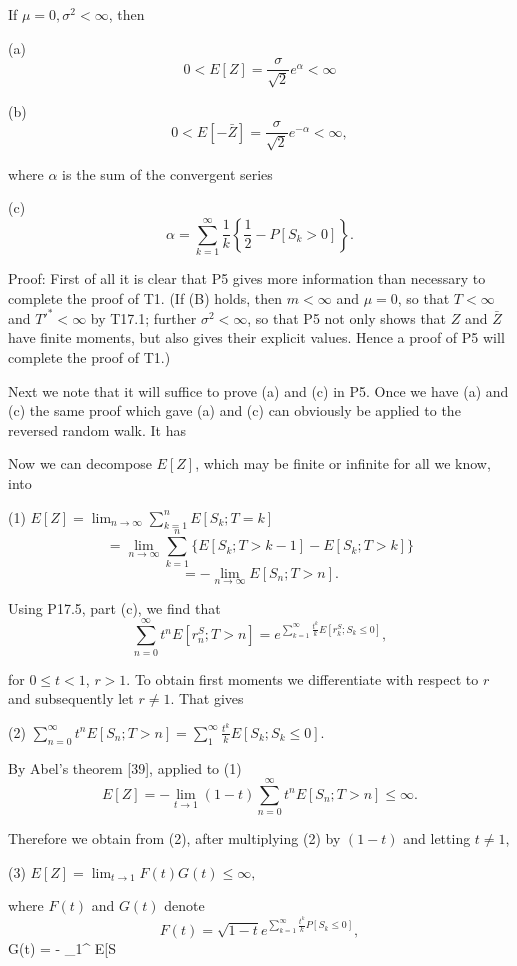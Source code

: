 If $\mu = 0, \sigma^2 < \infty$, then

(a) $$0 < E[Z] = \frac{\sigma}{\sqrt{2}} e^\alpha < \infty$$

(b) $$0 < E[-\bar{Z}] = \frac{\sigma}{\sqrt{2}} e^{-\alpha} < \infty,$$

where $\alpha$ is the sum of the convergent series

(c) $$\alpha = \sum_{k=1}^{\infty} \frac{1}{k} \left\{ \frac{1}{2} - P[S_k > 0] \right\}.$$

Proof: First of all it is clear that P5 gives more information than necessary to complete the proof of T1. (If (B) holds, then $m < \infty$ and $\mu = 0$, so that $T < \infty$ and $T'^* < \infty$ by T17.1; further $\sigma^2 < \infty$, so that P5 not only shows that $Z$ and $\bar{Z}$ have finite moments, but also gives their explicit values. Hence a proof of P5 will complete the proof of T1.)

Next we note that it will suffice to prove (a) and (c) in P5. Once we have (a) and (c) the same proof which gave (a) and (c) can obviously be applied to the reversed random walk. It has

Now we can decompose $E[Z]$, which may be finite or infinite for all we know, into

(1) $E[Z] = \lim_{n \to \infty} \sum_{k=1}^{n} E[S_k; T = k]$
$$= \lim_{n \to \infty} \sum_{k=1}^{n} \{E[S_k; T > k - 1] - E[S_k; T > k]\}$$
$$= - \lim_{n \to \infty} E[S_n; T > n].$$

Using P17.5, part (c), we find that
$$\sum_{n=0}^{\infty} t^n E[r^S_n; T > n] = e^{\sum_{k=1}^{\infty} \frac{t^k}{k} E[r^S_k; S_k \leq 0]},$$

for $0 \leq t < 1$, $r > 1$. To obtain first moments we differentiate with respect to $r$ and subsequently let $r \neq 1$. That gives

(2) $\sum_{n=0}^{\infty} t^n E[S_n; T > n] = \sum_{1}^{\infty} \frac{t^k}{k} E[S_k; S_k \leq 0]$.

By Abel's theorem [39], applied to (1)
$$E[Z] = - \lim_{t \to 1} (1 - t) \sum_{n=0}^{\infty} t^n E[S_n; T > n] \leq \infty.$$

Therefore we obtain from (2), after multiplying (2) by $(1 - t)$ and letting $t \neq 1$,

(3) $E[Z] = \lim_{t \to 1} F(t)G(t) \leq \infty,$

where $F(t)$ and $G(t)$ denote
$$F(t) = \sqrt{1 - t} e^{\sum_{k=1}^{\infty} \frac{t^k}{k} P[S_k \leq 0]},$$
$$G(t) = - \sum_{1}^{\infty}  E[S

